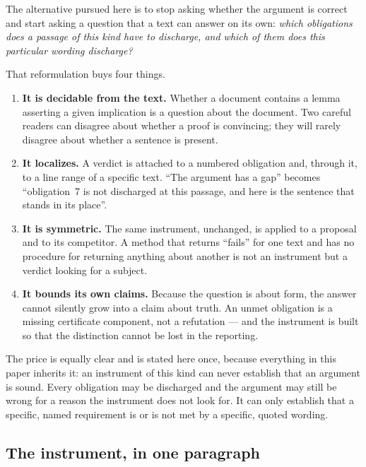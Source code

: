 \documentclass[11pt,a4paper]{article}
\theoremstyle{definition}
\begin{document}
The alternative pursued here is to stop asking whether the argument is correct
and start asking a question that a text can answer on its own: \emph{which
obligations does a passage of this kind have to discharge, and which of them does
this particular wording discharge?}

That reformulation buys four things.

\begin{enumerate}
\item \textbf{It is decidable from the text.} Whether a document contains a lemma
  asserting a given implication is a question about the document. Two careful
  readers can disagree about whether a proof is convincing; they will rarely
  disagree about whether a sentence is present.
\item \textbf{It localizes.} A verdict is attached to a numbered obligation and,
  through it, to a line range of a specific text. ``The argument has a gap''
  becomes ``obligation~7 is not discharged at this passage, and here is the
  sentence that stands in its place''.
\item \textbf{It is symmetric.} The same instrument, unchanged, is applied to a
  proposal and to its competitor. A method that returns ``fails'' for one text
  and has no procedure for returning anything about another is not an instrument
  but a verdict looking for a subject.
\item \textbf{It bounds its own claims.} Because the question is about form, the
  answer cannot silently grow into a claim about truth. An unmet obligation is a
  missing certificate component, not a refutation --- and the instrument is
  built so that the distinction cannot be lost in the reporting.
\end{enumerate}

The price is equally clear and is stated here once, because everything in this
paper inherits it: an instrument of this kind can never establish that an
argument is sound. Every obligation may be discharged and the argument may still
be wrong for a reason the instrument does not look for. It can only establish
that a specific, named requirement is or is not met by a specific, quoted
wording.

\subsection{The instrument, in one paragraph}
\end{document}

